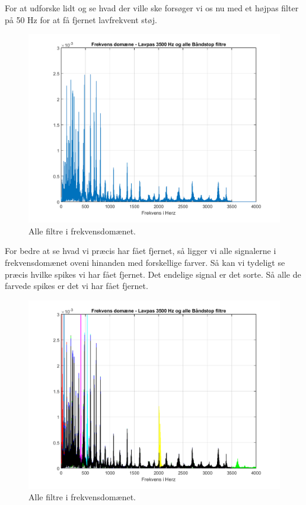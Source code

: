 \documentclass[12pt, letterpaper]{article}
\begin{document}
\newpage
For at udforske lidt og se hvad der ville ske forsøger vi os nu med et højpas filter på 50 Hz for at få fjernet lavfrekvent støj. 
\begin{figure}[H]
           \includegraphics[width=\linewidth]{billeder/VinylHP50}	   							\caption{Alle filtre i frekvensdomænet.}
\end{figure}

\newpage
For bedre at se hvad vi præcis har fået fjernet, så ligger vi alle signalerne i frekvensdomænet oveni hinanden med forskellige farver. Så kan vi tydeligt se præcis hvilke spikes vi har fået fjernet. Det endelige signal er det sorte. Så alle de farvede spikes er det vi har fået fjernet. 
\begin{figure}[H]
           \includegraphics[width=\linewidth]{billeder/Vinyldom}	   							\caption{Alle filtre i frekvensdomænet.}
\end{figure}
\end{document}
